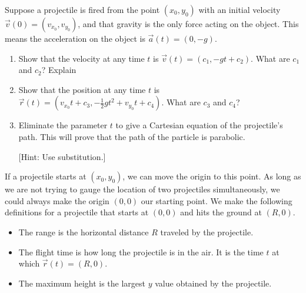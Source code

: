 \begin{problem}
%
Suppose a projectile is fired from the point $(x_0,y_0)$ with an initial velocity $\vec v(0)=(v_{x_0},v_{y_0})$, and that gravity is the only force acting on the object. This means the acceleration on the object is $\vec a(t) = (0,-g)$.
\begin{enumerate}
 \item Show that the velocity at any time $t$ is $\vec v(t) = (c_1,-gt+c_2)$. What are $c_1$ and $c_2$? Explain
 \item Show that the position at any time $t$ is $\vec r(t) = (v_{x_0}t+c_3, -\frac{1}{2}gt^2+v_{y_0}t+c_4)$. What are $c_3$ and $c_4$? 
 \item Eliminate the parameter $t$ to give a Cartesian equation of the projectile's path. This will prove that the path of the particle is parabolic.

[Hint: Use substitution.]
\end{enumerate}
\end{problem}

If a projectile starts at $(x_0,y_0)$, we can move the origin to this point. As long as we are not trying to gauge the location of two projectiles simultaneously, we could always make the origin $(0,0)$ our starting point.   
We make the following definitions for a projectile that starts at $(0,0)$ and hits the ground at $(R,0)$.
\begin{itemize}
 \item The range is the horizontal distance $R$ traveled by the projectile.  
 \item The flight time is how long the projectile is in the air. It is the time $t$ at which $\vec r(t)=(R,0)$.
 \item The maximum height is the largest $y$ value obtained by the projectile. 
\end{itemize}


